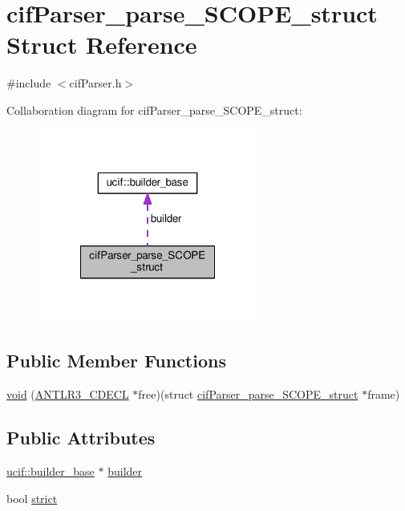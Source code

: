 \hypertarget{structcif_parser__parse___s_c_o_p_e__struct}{\section{cif\-Parser\-\_\-parse\-\_\-\-S\-C\-O\-P\-E\-\_\-struct Struct Reference}
\label{structcif_parser__parse___s_c_o_p_e__struct}
}


{\ttfamily \#include $<$cif\-Parser.\-h$>$}



Collaboration diagram for cif\-Parser\-\_\-parse\-\_\-\-S\-C\-O\-P\-E\-\_\-struct\-:
\nopagebreak
\begin{figure}[H]
\begin{center}
\leavevmode
\includegraphics[width=204pt]{structcif_parser__parse___s_c_o_p_e__struct__coll__graph}
\end{center}
\end{figure}
\subsection*{Public Member Functions}
\begin{DoxyCompactItemize}
\item 
\hyperlink{structcif_parser__parse___s_c_o_p_e__struct_ac25c10eb657de88d4cd62c6d714586ad}{void} (\hyperlink{antlr3defs_8h_a91c919dd260a95cc88a0cd9b5c0a11cc}{A\-N\-T\-L\-R3\-\_\-\-C\-D\-E\-C\-L} $\ast$free)(struct \hyperlink{structcif_parser__parse___s_c_o_p_e__struct}{cif\-Parser\-\_\-parse\-\_\-\-S\-C\-O\-P\-E\-\_\-struct} $\ast$frame)
\end{DoxyCompactItemize}
\subsection*{Public Attributes}
\begin{DoxyCompactItemize}
\item 
\hyperlink{structucif_1_1builder__base}{ucif\-::builder\-\_\-base} $\ast$ \hyperlink{structcif_parser__parse___s_c_o_p_e__struct_a04860f431cfa40cab0cd7b9d67cdd56f}{builder}
\item 
bool \hyperlink{structcif_parser__parse___s_c_o_p_e__struct_a41a8896fd06a1a6bef379ff2ec36d932}{strict}
\end{DoxyCompactItemize}


